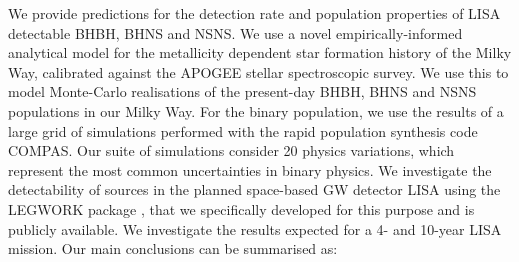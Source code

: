 We provide predictions for the detection rate and population properties of LISA detectable BHBH, BHNS and NSNS.
%
We use a novel empirically-informed analytical model for the metallicity dependent star formation history of the Milky Way, calibrated against the APOGEE stellar spectroscopic survey. We use this to model Monte-Carlo realisations of the present-day BHBH, BHNS and NSNS populations in our Milky Way. 
%
For the binary population, we use the results of a large grid of simulations performed with the rapid population synthesis code COMPAS. Our suite of simulations consider 20 physics variations, which represent the most common uncertainties in binary physics.
%
We investigate the detectability of sources in the planned space-based GW detector LISA using the LEGWORK package \citep{Wagg+2021}, that we specifically developed for this purpose and is publicly available. 
%
We investigate the results expected for a 4- and 10-year LISA mission. Our main conclusions can be summarised as:
